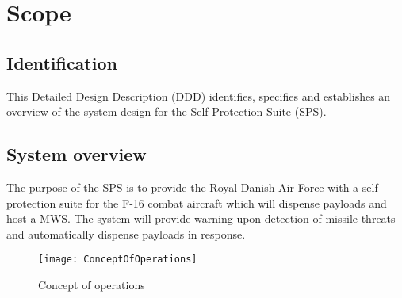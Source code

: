 \documentclass[Main]{subfiles}
\begin{document}
\chapter{Scope}

\section{Identification}
This Detailed Design Description (DDD) identifies, specifies and establishes an overview of the system design for the Self Protection Suite (SPS).

\section{System overview}
The purpose of the SPS is to provide the Royal Danish Air Force with a self-protection suite for the F-16 combat aircraft which will dispense payloads and host a MWS. 
The system will provide warning upon detection of missile threats and automatically dispense payloads in response.

\begin{figure}[htbp]
\centering
\texttt{[image: ConceptOfOperations]}
\caption{Concept of operations}
\end{figure}
\end{document}

